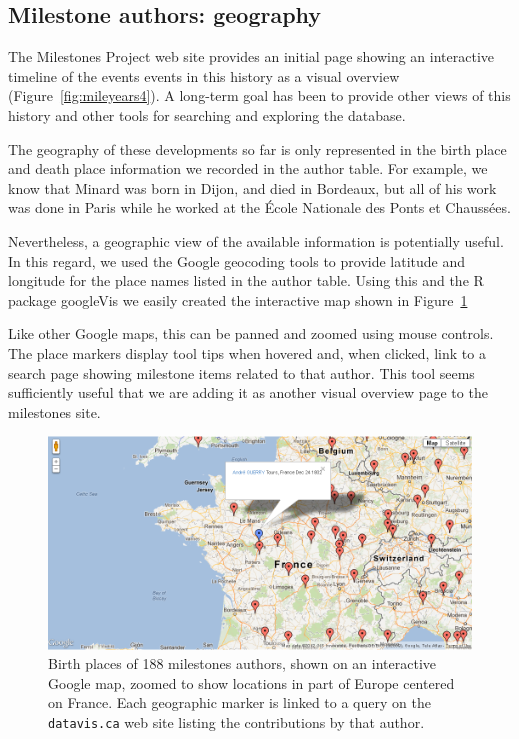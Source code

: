 \documentclass[11pt]{article}
\newcommand*{\figref}[1]{Figure~\ref{#1}}
\begin{document}
\subsection{Milestone authors: geography}\label{sec:geography}
The Milestones Project web site provides an initial page showing an interactive timeline
of the events events in this history as a visual overview (\figref{fig:mileyears4}).
A long-term goal has been to
provide other views of this history and other tools for searching and exploring the
database.

The geography of these developments so far is only represented in the birth place
and death place information we recorded in the author table.
For example, we know that Minard was born in Dijon, and died in Bordeaux, but
all of his work was done in Paris while he worked at the
{\'E}cole Nationale des Ponts et Chauss{\'e}es.

Nevertheless, a geographic view of the available information is potentially useful.
In this regard, we used the Google geocoding tools to provide latitude and
longitude for the place names listed in the author table.  Using this and the
R package googleVis \citep{googleVis} we easily created the interactive map shown
in \figref{fig:authormap}

Like other Google maps, this can be panned and zoomed using mouse controls.
The place markers display tool tips when hovered and, when clicked, link to
a search page showing milestone items related to that author.
This tool seems sufficiently useful that we are adding it as another visual
overview page to the milestones site.


\begin{figure}[!htb]
  \centering
  \includegraphics[width=\textwidth,clip]{fig/authormap}
  \caption{Birth places of 188 milestones authors, shown on an interactive Google map, zoomed to show locations
  in part of Europe centered on France. Each geographic marker is linked to a query on
  the \texttt{datavis.ca} web site listing the contributions by that author.
  }
  \label{fig:authormap}
\end{figure}
\end{document}
